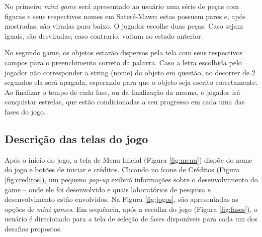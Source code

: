 \documentclass[12pt]{article}
\begin{document}
		No primeiro \textit{mini game} será apresentado ao usuário uma série de peças com figuras e seus respectivos nomes em Sateré-Mawe; estas possuem pares e, após mostradas, são viradas para baixo. O jogador escolhe duas peças. Caso sejam iguais, são desviradas; caso contrario, voltam ao estado anterior.
		
		No segundo game, os objetos estarão dispersos pela tela com seus respectivos campos para o preenchimento correto da palavra. Caso a letra escolhida pelo jogador não corresponder a string (nome) do objeto em questão, no decorrer de 2 segundos ela será apagada, esperando para que o objeto seja escrito corretamente. Ao finalizar o tempo de cada fase, ou da finalização da mesma, o jogador irá conquistar estrelas, que estão condicionadas a seu progresso em cada uma das fases do jogo.
   
	\subsection{Descrição das telas do jogo}
		Após o início do jogo, a tela de Menu Inicial (Figura \ref{fig:menu}) dispõe do nome do jogo e botões de iniciar e créditos. Clicando no ícone de Créditos (Figura \ref{fig:creditos}), um pequeno \textit{pop-up} exibirá informações sobre o desenvolvimento do game -- onde ele foi desenvolvido e quais laboratórios de pesquisa e desenvolvimento estão envolvidos. Na Figura \ref{fig:jogos}, são apresentadas as opções de \textit{mini games}. Em sequência, após a escolha do jogo (Figura \ref{fig:fases}), o usuário é direcionado para a tela de seleção de fases disponíveis para cada um dos desafios propostos.
	
\end{document}
